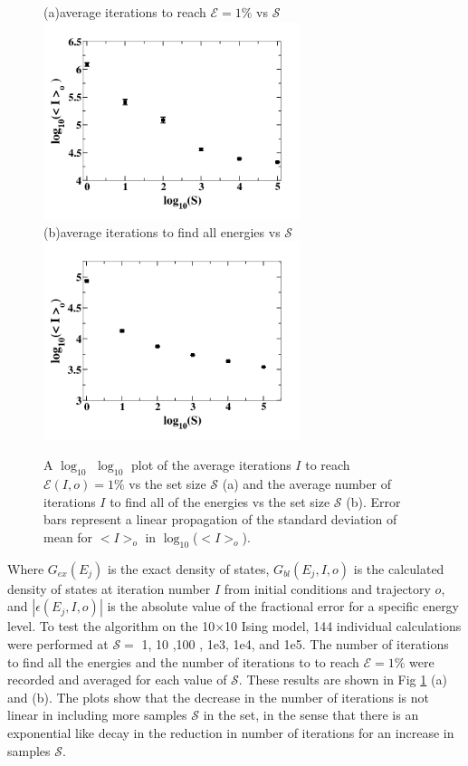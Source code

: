 \documentclass[aps,prl,reprint,superscriptaddress,showkeys]{revtex4-1}
\begin{document}
\begin{figure}[h!]
(a)\hspace{0.1cm}average iterations to reach $\mathcal{E}=1\%$ vs $\mathcal{S}$\\
\includegraphics[width=7.5cm]{its_vs_S.png}\\
(b)\hspace{0.1cm}average iterations to find all energies vs $\mathcal{S}$\\
\includegraphics[width=7.5cm]{its_to_find.png}
\caption{\label{its_to}A $\log_{10}$ $\log_{10}$  plot of the average iterations $I$ to reach $\mathcal{E}(I,o)=1\%$ vs the set size $\mathcal{S}$ (a) and the average number of iterations $I$ to find all of the energies vs the set size $\mathcal{S}$ (b). Error bars represent a linear propagation of the standard deviation of mean for $<I>_o$ in $\log_{10}$($<I>_o$). }
\end{figure}
Where $G_{ex}(E_j)$ is the exact density of states, $G_{bl}(E_j,I,o)$ is the calculated density of states  at iteration number $I$ from initial conditions and trajectory $o$, and $|\epsilon(E_j,I,o)|$ is the absolute value of the fractional error for a specific energy level. To test the algorithm on the 10$\times$10 Ising model, 144 individual calculations were performed at  $\mathcal{S}=$ 1, 10 ,100 , 1e3,  1e4, and 1e5. The number of iterations to find all the energies and the number of iterations to to reach $\mathcal{E}=1\%$ were recorded and averaged for each value of $\mathcal{S}$. These results are shown in Fig \ref{its_to}  (a) and (b).  The plots show that the decrease in the number of iterations is not linear in including more samples $\mathcal{S}$ in the set, in the sense that there is an exponential like decay in the reduction in number of  iterations for an increase in samples $\mathcal{S}$.  
\end{document}
